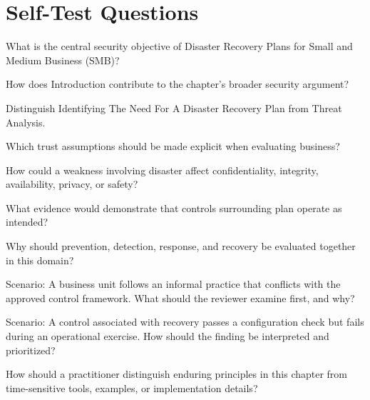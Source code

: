 \documentclass[11pt,letterpaper]{article}
\begin{document}
\section*{Self-Test Questions}
\begin{CornellRecallList}
\item What is the central security objective of Disaster Recovery Plans for Small and Medium Business (SMB)?
\item How does Introduction contribute to the chapter's broader security argument?
\item Distinguish Identifying The Need For A Disaster Recovery Plan from Threat Analysis.
\item Which trust assumptions should be made explicit when evaluating business?
\item How could a weakness involving disaster affect confidentiality, integrity, availability, privacy, or safety?
\item What evidence would demonstrate that controls surrounding plan operate as intended?
\item Why should prevention, detection, response, and recovery be evaluated together in this domain?
\item Scenario: A business unit follows an informal practice that conflicts with the approved control framework. What should the reviewer examine first, and why?
\item Scenario: A control associated with recovery passes a configuration check but fails during an operational exercise. How should the finding be interpreted and prioritized?
\item How should a practitioner distinguish enduring principles in this chapter from time-sensitive tools, examples, or implementation details?
\end{CornellRecallList}
\end{document}
